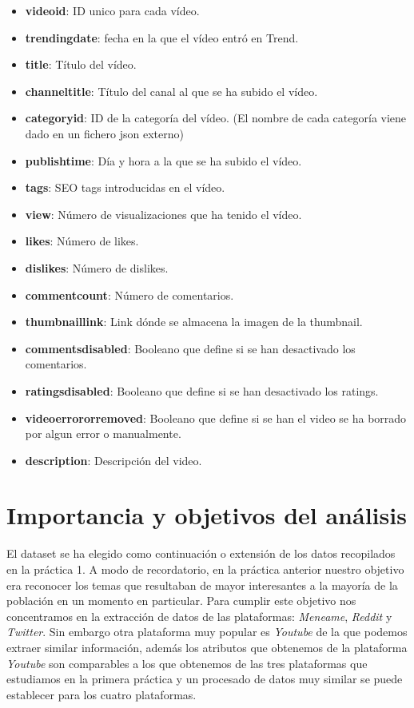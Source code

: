 \documentclass[a4paper,12pt]{article}
\begin{document}
\begin{itemize}

\item \textbf{video{\textunderscore}id}: ID unico para cada v\'ideo.
\item \textbf{trending{\textunderscore}date}: fecha en la que el v\'ideo entr\'o en Trend.
\item \textbf{title}: T\'itulo del v\'ideo.
\item \textbf{channel{\textunderscore}title}: T\'itulo del canal al que se ha subido el v\'ideo.
\item \textbf{category{\textunderscore}id}: ID de la categor\'ia del v\'ideo. (El nombre de cada categor\'ia viene dado en un fichero json externo)
\item \textbf{publish{\textunderscore}time}: D\'ia y hora a la que se ha subido el v\'ideo.
\item \textbf{tags}: SEO tags introducidas en el v\'ideo.
\item \textbf{view}: N\'umero de visualizaciones que ha tenido el v\'ideo.
\item \textbf{likes}: N\'umero de likes.
\item \textbf{dislikes}: N\'umero de dislikes.
\item \textbf{comment{\textunderscore}count}: N\'umero de comentarios.
\item \textbf{thumbnail{\textunderscore}link}: Link d\'onde se almacena la imagen de la thumbnail.
\item \textbf{comments{\textunderscore}disabled}: Booleano que define si se han desactivado los comentarios.
\item \textbf{ratings{\textunderscore}disabled}: Booleano que define si se han desactivado los ratings.
\item \textbf{video{\textunderscore}error{\textunderscore}or{\textunderscore}removed}: Booleano que define si se han el video se ha borrado por algun error o manualmente.
\item \textbf{description}: Descripci\'on del video.

\end{itemize}

\section[item_importancia]{Importancia y objetivos del an\'alisis}

El dataset se ha elegido como continuaci\'on o extensi\'on de los datos recopilados en la pr\'actica 1. A modo de recordatorio, en la pr\'actica anterior nuestro objetivo era reconocer los temas que resultaban de mayor interesantes a la mayor\'ia de la poblaci\'on en un momento en particular. Para cumplir este objetivo nos concentramos en la extracci\'on de datos de las plataformas:  {\itshape Meneame}, {\itshape Reddit} y {\itshape Twitter}. Sin embargo otra plataforma muy popular es {\itshape Youtube} de la que podemos extraer similar informaci\'on, adem\'as los atributos que obtenemos de la plataforma {\itshape Youtube} son comparables a los que obtenemos de las tres plataformas que estudiamos en la primera pr\'actica y un procesado de datos muy similar se puede establecer para los cuatro plataformas.
\end{document}

